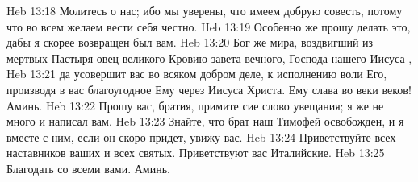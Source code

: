 \rsbpar\vs Heb 13:18 Молитесь о нас; ибо мы уверены, что имеем добрую совесть, потому что во всем желаем вести себя честно.
\vs Heb 13:19 Особенно же прошу делать это, дабы я скорее возвращен был вам.
\vs Heb 13:20 Бог же мира, воздвигший из мертвых Пастыря овец великого Кровию завета вечного, Господа нашего Иисуса ,
\vs Heb 13:21 да усовершит вас во всяком добром деле, к исполнению воли Его, производя в вас благоугодное Ему через Иисуса Христа. Ему слава во веки веков! Аминь.
\rsbpar\vs Heb 13:22 Прошу вас, братия, примите сие слово увещания; я же не много и написал вам.
\vs Heb 13:23 Знайте, что брат наш Тимофей освобожден, и я вместе с ним, если он скоро придет, увижу вас.
\rsbpar\vs Heb 13:24 Приветствуйте всех наставников ваших и всех святых. Приветствуют вас Италийские.
\rsbpar\vs Heb 13:25 Благодать со всеми вами. Аминь.
